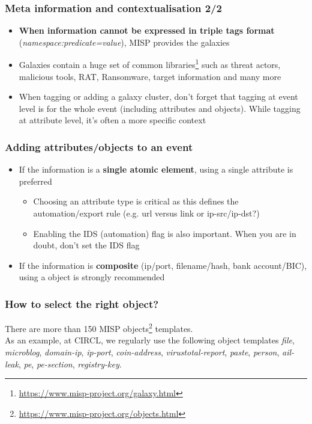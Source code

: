 \begin{frame}
\frametitle{Meta information and contextualisation 2/2}
\begin{itemize}
        \item {\bf When information cannot be expressed in triple tags format} ({\it namespace:predicate=value}), MISP provides the galaxies
        \item Galaxies contain a huge set of common libraries\footnote{\url{https://www.misp-project.org/galaxy.html}} such as threat actors, malicious tools, RAT, Ransomware, target information and many more
        \item When tagging or adding a galaxy cluster, don't forget that tagging at event level is for the whole event (including attributes and objects). While tagging at attribute level, it's often a more specific context
\end{itemize}
\end{frame}

\begin{frame}
\frametitle{Adding attributes/objects to an event}
\begin{itemize}
        \item If the information is a {\bf single atomic element}, using a single attribute is preferred
                \begin{itemize}
                        \item Choosing an attribute type is critical as this defines the automation/export rule (e.g. url versus link or ip-src/ip-dst?)
                        \item Enabling the IDS (automation) flag is also important. When you are in doubt, don't set the IDS flag
                \end{itemize}
        \item If the information is {\bf composite} (ip/port, filename/hash, bank account/BIC), using a object is strongly recommended
\end{itemize}
\end{frame}

\begin{frame}
       \frametitle{How to select the right object?}

        There are more than 150 MISP objects\footnote{\url{https://www.misp-project.org/objects.html}} templates.\\
      As an example, at CIRCL, we regularly use the following object templates {\it file}, {\it microblog}, {\it domain-ip}, {\it ip-port}, {\it coin-address}, {\it virustotal-report}, {\it paste}, {\it person}, {\it ail-leak}, {\it pe}, {\it pe-section}, {\it registry-key}.\\
\end{frame}

